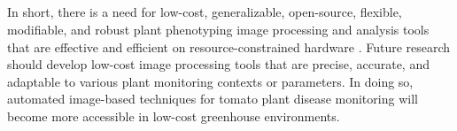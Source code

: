 \subparagraph{}
In short, there is a need for low-cost, generalizable,  open-source, flexible, modifiable, and robust plant phenotyping image processing and analysis tools that are effective and efficient on resource-constrained hardware \cite{minerviniImageAnalysisNew2015}. Future research should develop low-cost image processing tools that are precise, accurate, and adaptable to various plant monitoring contexts or parameters. In doing so, automated image-based techniques for tomato plant disease monitoring will become more accessible in low-cost greenhouse environments.